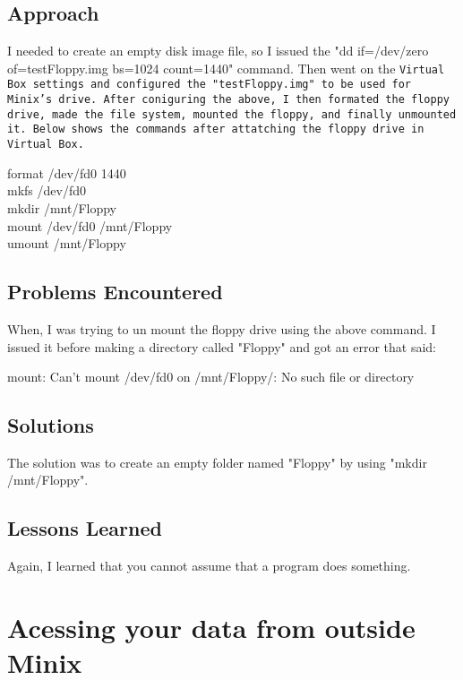 \documentclass[11pt]{article}
\begin{document}
\subsection{Approach}

  I needed to create an empty disk image file, 
so I issued the "dd if=/dev/zero of=testFloppy.img bs=1024 count=1440" 
command. Then went on the \tt {Virtual Box} settings and configured 
the "testFloppy.img" to be used for Minix's drive. After coniguring the above, 
I then formated the floppy drive, made the file system, mounted the floppy, 
and finally unmounted it. Below shows the commands after attatching the 
floppy drive in \tt{Virtual Box}.

{\tt\begin{tabbing}
format /dev/fd0 1440\\
mkfs /dev/fd0\\
mkdir /mnt/Floppy\\
mount /dev/fd0 /mnt/Floppy\\
umount /mnt/Floppy
\end{tabbing}}

\subsection{Problems Encountered}

  When, I was trying to un mount the floppy drive using the above 
command. I issued it before making a directory called "Floppy" and got an 
error that said:

{\tt\begin{tabbing}
mount: Can't mount /dev/fd0 on /mnt/Floppy/: No such file or directory
\end{tabbing}}

\subsection{Solutions}

The solution was to create an empty folder named "Floppy" by using "mkdir /mnt/Floppy".

\subsection{Lessons Learned}
  Again, I learned that you cannot assume that a program does something.

		
\setcounter{section}{4} %
\section{Acessing your data from outside Minix}
\end{document}
